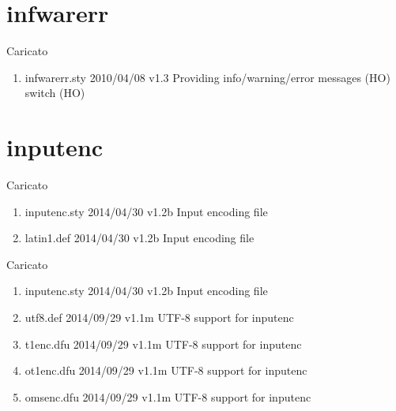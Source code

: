 \section{infwarerr}  

Caricato 
\begin{enumerate}
\item infwarerr.sty 2010/04/08 v1.3 Providing info/warning/error messages (HO) switch (HO)
\end{enumerate} 
\section{inputenc}  

Caricato 
\begin{enumerate}
\item inputenc.sty 2014/04/30 v1.2b Input encoding file
\item latin1.def 2014/04/30 v1.2b Input encoding file 
\end{enumerate} 

Caricato 
\begin{enumerate}
\item inputenc.sty 2014/04/30 v1.2b Input encoding file
\item utf8.def 2014/09/29 v1.1m UTF-8 support for inputenc
\item t1enc.dfu 2014/09/29 v1.1m UTF-8 support for inputenc
\item ot1enc.dfu 2014/09/29 v1.1m UTF-8 support for inputenc
\item omsenc.dfu 2014/09/29 v1.1m UTF-8 support for inputenc
\end{enumerate}  

